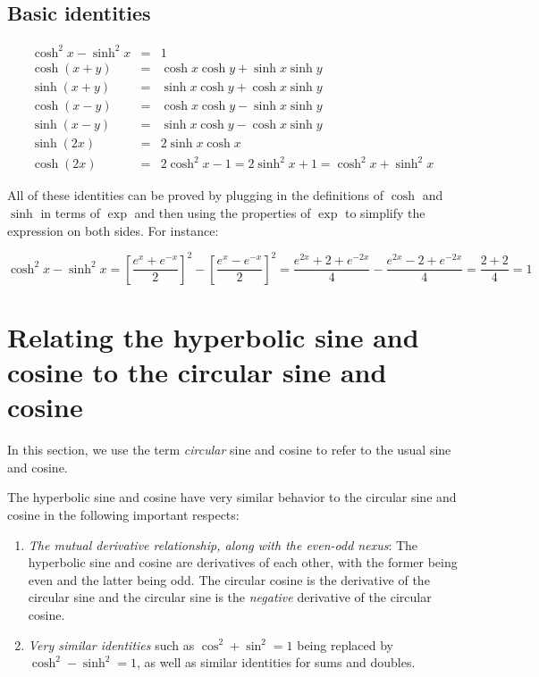 \documentclass{amsart}
\begin{document}
\subsection{Basic identities}

\begin{eqnarray*}
  \cosh^2 x - \sinh^2 x & = & 1\\
  \cosh(x + y) & = & \cosh x \cosh y + \sinh x \sinh y\\
  \sinh(x + y) & = & \sinh x \cosh y + \cosh x \sinh y \\
  \cosh(x - y) & = & \cosh x \cosh y - \sinh x \sinh y \\
  \sinh(x - y) & = & \sinh x \cosh y - \cosh x \sinh y \\
  \sinh(2x) & = & 2 \sinh x \cosh x\\
  \cosh(2x) & = & 2\cosh^2 x - 1 = 2\sinh^2 x + 1 = \cosh^2 x + \sinh^2 x
\end{eqnarray*}

All of these identities can be proved by plugging in the definitions
of $\cosh$ and $\sinh$ in terms of $\exp$ and then using the
properties of $\exp$ to simplify the expression on both sides. For instance:

$$\cosh^2 x - \sinh^2 x = \left[\frac{e^x + e^{-x}}{2}\right]^2 - \left[\frac{e^x - e^{-x}}{2}\right]^2 = \frac{e^{2x} + 2 + e^{-2x}}{4} - \frac{e^{2x} - 2 + e^{-2x}}{4} = \frac{2 + 2}{4} = 1$$

\section{Relating the hyperbolic sine and cosine to the circular sine and cosine}

In this section, we use the term {\em circular} sine and cosine to
refer to the usual sine and cosine.

The hyperbolic sine and cosine have very similar behavior to the
circular sine and cosine in the following important respects:

\begin{enumerate}
\item {\em The mutual derivative relationship, along with the even-odd
  nexus}: The hyperbolic sine and cosine are derivatives of each
  other, with the former being even and the latter being odd. The
  circular cosine is the derivative of the circular sine and the
  circular sine is the {\em negative} derivative of the circular
  cosine.
\item {\em Very similar identities} such as $\cos^2 + \sin^2 = 1$
  being replaced by $\cosh^2 - \sinh^2 = 1$, as well as similar
  identities for sums and doubles.
\end{enumerate}
\end{document}
